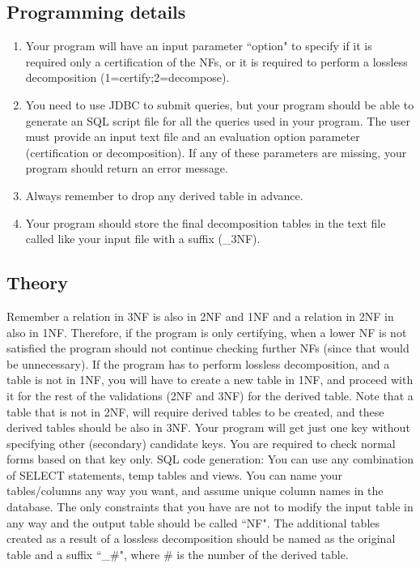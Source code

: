 \subsection{Programming details}
\begin{enumerate}
	\item Your program will have an input parameter ``option" to specify if it is required only a certification of the NFs, or it is required to
	perform a lossless decomposition (1=certify;2=decompose).
	\item You need to use JDBC to submit queries, but your program should be able to generate an SQL script file for all the queries used in your program.
The user must provide an input text file and an evaluation option parameter (certification or decomposition). %
If any of these parameters
are missing, your program should return an error message. 
	\item Always remember to drop any derived table in advance.
	\item Your program should store the final decomposition tables in the text file called like your input file with a suffix (\_3NF).
\end{enumerate}

\subsection{Theory}

Remember a relation in 3NF is also in 2NF and 1NF and a relation in 2NF in also in 1NF. 
Therefore, if the program is only certifying, when a lower NF is not satisfied the
program should not continue checking further NFs (since that would be unnecessary).
If the program has to perform lossless decomposition, and a
table is not in 1NF, you will have to create a new table in 1NF, and proceed with it for the rest of
the validations (2NF and 3NF) for the derived table.
Note that a table that is not in 2NF, will require derived tables to be created, and these derived
tables should be also in 3NF.
Your program will get just one key without specifying other (secondary) candidate keys. You are required
to check normal forms based on that key only.
SQL code generation: You can use any combination of SELECT statements, temp tables and views. You
can name your tables/columns any way you want, and assume unique column names in the database. The only constraints that you have are not to modify the input
table in any way and the output table should be called ``NF". 
The additional tables created as a result of a lossless decomposition should be named
as the original table and a suffix ``\_\#", where \# is the number of the derived table.

